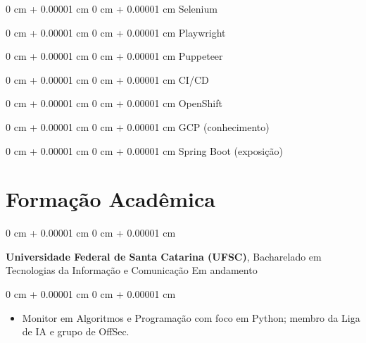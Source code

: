 \documentclass[10pt, letterpaper]{article}
\newenvironment{highlights}{
    \begin{itemize}[
        topsep=0.10 cm,
        parsep=0.10 cm,
        partopsep=0pt,
        itemsep=0pt,
        leftmargin=0 cm + 10pt
    ]
}{
    \end{itemize}
}
\newenvironment{onecolentry}{
    \begin{adjustwidth}{
        0 cm + 0.00001 cm
    }{
        0 cm + 0.00001 cm
    }
}{
    \end{adjustwidth}
}
\begin{document}
\vspace{0.2cm}
\begin{onecolentry}Selenium\end{onecolentry}
\vspace{0.2cm}
\begin{onecolentry}Playwright\end{onecolentry}
\vspace{0.2cm}
\begin{onecolentry}Puppeteer\end{onecolentry}
\vspace{0.2cm}
\begin{onecolentry}CI/CD\end{onecolentry}
\vspace{0.2cm}
\begin{onecolentry}OpenShift\end{onecolentry}
\vspace{0.2cm}
\begin{onecolentry}GCP (conhecimento)\end{onecolentry}
\vspace{0.2cm}
\begin{onecolentry}Spring Boot (exposição)\end{onecolentry}
\section{Formação Acadêmica}

    \begin{onecolentry}
        \setcolumnwidth{\fill, 4.5cm}
        \begin{paracol}{2}
            \textbf{Universidade Federal de Santa Catarina (UFSC)}, Bacharelado em Tecnologias da Informação e Comunicação
            \switchcolumn
            \raggedleft Em andamento
        \end{paracol}
    \end{onecolentry}
    \vspace{0.10cm}
    \begin{onecolentry}
        \begin{highlights}
                    \item Monitor em Algoritmos e Programação com foco em Python; membro da Liga de IA e grupo de OffSec.
        \end{highlights}
    \end{onecolentry}
    
\vspace{0.2cm}
\end{document}
